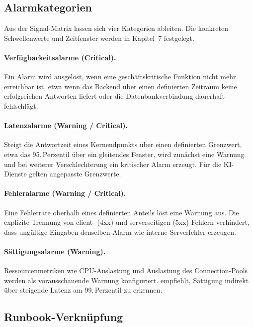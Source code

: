  
\subsection{Alarmkategorien}
 
Aus der Signal-Matrix lassen sich vier Kategorien ableiten. Die konkreten Schwellenwerte und Zeitfenster werden in Kapitel~7 festgelegt.
 
\paragraph{Verfügbarkeitsalarme (Critical).}
Ein Alarm wird ausgelöst, wenn eine geschäftskritische Funktion nicht mehr erreichbar ist, etwa wenn das Backend über einen definierten Zeitraum keine erfolgreichen Antworten liefert oder die Datenbankverbindung dauerhaft fehlschlägt.
 
\paragraph{Latenzalarme (Warning / Critical).}
Steigt die Antwortzeit eines Kernendpunkts über einen definierten Grenzwert, etwa das 95.\,Perzentil über ein gleitendes Fenster, wird zunächst eine Warnung und bei weiterer Verschlechterung ein kritischer Alarm erzeugt. Für die KI-Dienste gelten angepasste Grenzwerte.
 
\paragraph{Fehleralarme (Warning / Critical).}
Eine Fehlerrate oberhalb eines definierten Anteils löst eine Warnung aus. Die explizite Trennung von client- (4xx) und serverseitigen (5xx) Fehlern verhindert, dass ungültige Eingaben denselben Alarm wie interne Serverfehler erzeugen.
 
\paragraph{Sättigungsalarme (Warning).}
Ressourcenmetriken wie CPU-Auslastung und Auslastung des Connection-Pools werden als vorausschauende Warnung konfiguriert. \textcite[S.~60--61]{ewaschukMonitoringDistributedSystems} empfiehlt, Sättigung indirekt über steigende Latenz am 99.\,Perzentil zu erkennen.
 
 
\subsection{Runbook-Verknüpfung}
 
